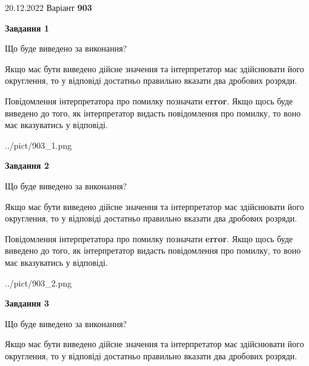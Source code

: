 \documentclass[12pt, ukrainian]{article}
\begin{document}
{20.12.2022 Варіант \No \textbf { 903 }\par}
{
\begin {Large}

{\begin {center}\textbf{Завдання 1}\end {center}}\par
Що буде виведено за виконання? \par

Якщо має бути виведено дійсне значення та інтерпретатор має здійснювати його округлення, 
то у відповіді достатньо правильно вказати два дробових розряди.

Повідомлення інтерпретатора про помилку позначати \textbf{error}.
Якщо щось буде виведено до того, як інтерпретатор видасть повідомлення про помилку, 
то воно має вказуватись у відповіді. \par

\begin{center}
	{../pict/903_1.png}
\end{center}
\newpage

{\begin {center}\textbf{Завдання 2}\end {center}}\par
Що буде виведено за виконання? \par

Якщо має бути виведено дійсне значення та інтерпретатор має здійснювати його округлення, 
то у відповіді достатньо правильно вказати два дробових розряди.

Повідомлення інтерпретатора про помилку позначати \textbf{error}.
Якщо щось буде виведено до того, як інтерпретатор видасть повідомлення про помилку, 
то воно має вказуватись у відповіді. \par

\begin{center}
	{../pict/903_2.png}
\end{center}
\newpage

{\begin {center}\textbf{Завдання 3}\end {center}}\par
Що буде виведено за виконання? \par

Якщо має бути виведено дійсне значення та інтерпретатор має здійснювати його округлення, 
то у відповіді достатньо правильно вказати два дробових розряди.


\end{Large}}
\end{document}
